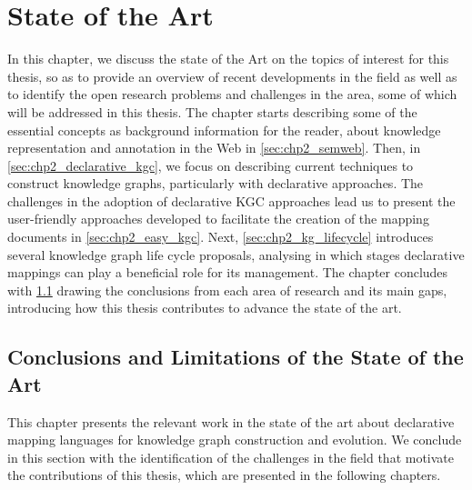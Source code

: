 \chapter{State of the Art}
\label{chapter:sota}

In this chapter, we discuss the state of the Art on the topics of interest for this thesis, so as to provide an overview of recent developments in the field as well as to identify the open research problems and challenges in the area, some of which will be addressed in this thesis. 
The chapter starts describing some of the essential concepts as background information for the reader, about knowledge representation and annotation in the Web in \cref{sec:chp2_semweb}. 
Then, in \cref{sec:chp2_declarative_kgc}, we focus on describing current techniques to construct knowledge graphs, particularly with declarative approaches. 
The challenges in the adoption of declarative KGC approaches lead us to present the user-friendly approaches developed to facilitate the creation of the mapping documents in \cref{sec:chp2_easy_kgc}. Next, \cref{sec:chp2_kg_lifecycle} introduces several knowledge graph life cycle proposals, analysing in which stages declarative mappings can play a beneficial role for its management. 
The chapter concludes with \cref{sec:chp2_conclusions-sota} drawing the conclusions from each area of research and its main gaps, introducing how this thesis contributes to advance the state of the art. 










\section{Conclusions and Limitations of the State of the Art}
\label{sec:chp2_conclusions-sota}

This chapter presents the relevant work in the state of the art about declarative mapping languages for knowledge graph construction and evolution. 
We conclude in this section with the identification of the challenges in the field that motivate the contributions of this thesis, which are presented in the following chapters.

